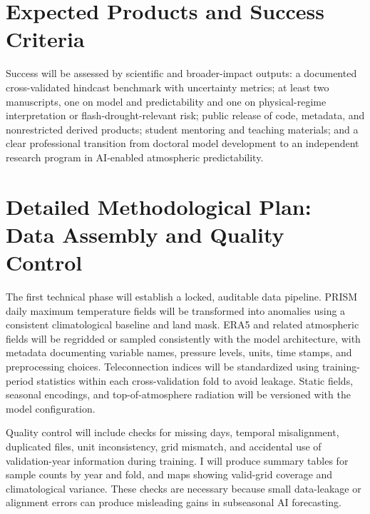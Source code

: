 \documentclass[11pt,letterpaper]{article}
\begin{document}
\section*{Expected Products and Success Criteria}
Success will be assessed by scientific and broader-impact outputs: a documented cross-validated hindcast benchmark with uncertainty metrics; at least two manuscripts, one on model and predictability and one on physical-regime interpretation or flash-drought-relevant risk; public release of code, metadata, and nonrestricted derived products; student mentoring and teaching materials; and a clear professional transition from doctoral model development to an independent research program in AI-enabled atmospheric predictability.

\newpage
\section*{Detailed Methodological Plan: Data Assembly and Quality Control}
The first technical phase will establish a locked, auditable data pipeline. PRISM daily maximum temperature fields will be transformed into anomalies using a consistent climatological baseline and land mask. ERA5 and related atmospheric fields will be regridded or sampled consistently with the model architecture, with metadata documenting variable names, pressure levels, units, time stamps, and preprocessing choices. Teleconnection indices will be standardized using training-period statistics within each cross-validation fold to avoid leakage. Static fields, seasonal encodings, and top-of-atmosphere radiation will be versioned with the model configuration.

Quality control will include checks for missing days, temporal misalignment, duplicated files, unit inconsistency, grid mismatch, and accidental use of validation-year information during training. I will produce summary tables for sample counts by year and fold, and maps showing valid-grid coverage and climatological variance. These checks are necessary because small data-leakage or alignment errors can produce misleading gains in subseasonal AI forecasting.
\end{document}
